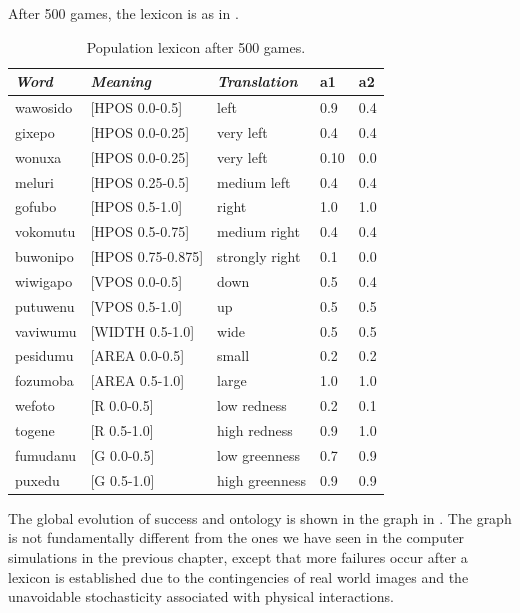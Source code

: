 After 500 games, the lexicon is as in . 
\begin{table}
\begin{center}
\begin{tabular}{| l | l | l | l | l |} \hline
{\it Word}&{\it Meaning}&{\it Translation} & {\bf a1}&{\bf a2} \\ \hline
wawosido & [HPOS 0.0-0.5] &left&0.9&0.4\\ \hline
gixepo & [HPOS 0.0-0.25] & very left&0.4&0.4\\ \hline
wonuxa & [HPOS 0.0-0.25] & very left&0.10&0.0\\ \hline
meluri & [HPOS 0.25-0.5] &medium left&0.4&0.4\\ \hline
gofubo & [HPOS 0.5-1.0]& right&1.0&1.0\\ \hline
vokomutu & [HPOS 0.5-0.75] &medium right&0.4&0.4\\ \hline
buwonipo & [HPOS 0.75-0.875] &strongly right&0.1&0.0\\ \hline
wiwigapo & [VPOS 0.0-0.5] &down&0.5&0.4\\ \hline
putuwenu & [VPOS 0.5-1.0]&up & 0.5&0.5\\ \hline
vaviwumu & [WIDTH 0.5-1.0]&wide & 0.5&0.5\\ \hline
pesidumu & [AREA 0.0-0.5]&small& 0.2&0.2\\ \hline
fozumoba & [AREA 0.5-1.0]&large & 1.0&1.0\\ \hline
wefoto & [R 0.0-0.5]& low redness &0.2&0.1\\ \hline
togene & [R 0.5-1.0]& high redness &0.9&1.0\\ \hline
fumudanu & [G 0.0-0.5]& low greenness &0.7&0.9\\ \hline
puxedu & [G 0.5-1.0]& high greenness &0.9&0.9\\ \hline
\end{tabular}
\caption{ \label{tab:puxedu} Population lexicon after 500 games.}
\end{center}
\end{table}
The global evolution of success and ontology is shown in the 
graph in . The graph is not 
fundamentally different from the ones we have
seen in the computer simulations in the previous
chapter, except that more failures occur after a lexicon
is established due to the contingencies of real 
world images and the unavoidable stochasticity 
associated with physical interactions. 
